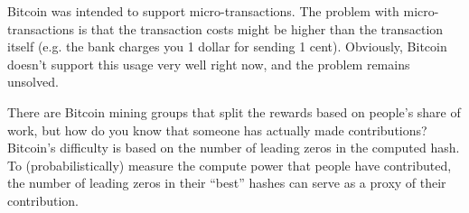 \documentclass[twoside]{article}
\begin{document}
Bitcoin was intended to support micro-transactions. The problem with micro-transactions is that the transaction costs might be higher than the transaction itself (e.g. the bank charges you 1 dollar for sending 1 cent). Obviously, Bitcoin doesn't support this usage very well right now, and the problem remains unsolved.

There are Bitcoin mining groups that split the rewards based on people's share of work, but how do you know that someone has actually made contributions? Bitcoin's difficulty is based on the number of leading zeros in the computed hash. To (probabilistically) measure the compute power that people have contributed, the number of leading zeros in their ``best'' hashes can serve as a proxy of their contribution.
\end{document}
